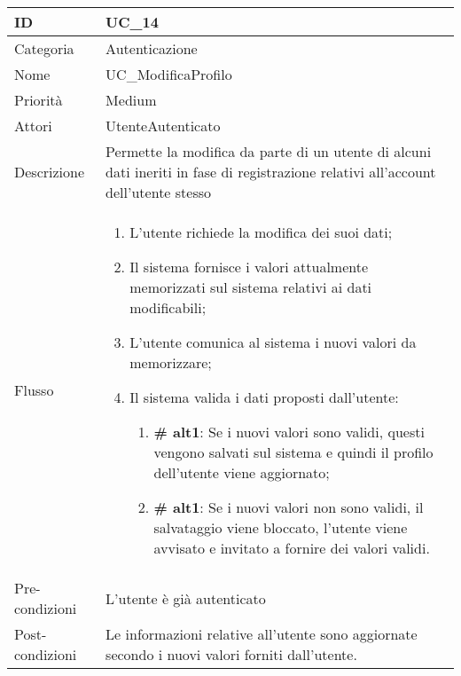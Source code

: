 \begin{center}
\begin{tabular}{ |p{2cm}|p{13cm}|  }
\hline
ID & UC\_14\\\hline
Categoria & Autenticazione \\\hline
Nome & UC\_ModificaProfilo \\\hline
Priorità & Medium \\\hline
Attori &  UtenteAutenticato \\\hline
Descrizione & Permette la modifica da parte di un utente di alcuni dati ineriti in fase di registrazione relativi all'account dell'utente stesso  \\\hline
Flusso &  	\begin{enumerate}
			\item L'utente richiede la modifica dei suoi dati;
			\item Il sistema fornisce i valori attualmente memorizzati sul sistema relativi ai dati modificabili;
			\item L'utente comunica al sistema i nuovi valori da memorizzare;
			\item Il sistema valida i dati proposti dall'utente:
			\begin{enumerate}[  ]
				\item\textbf{\# alt1}: Se i nuovi valori sono validi, questi vengono salvati sul sistema e quindi il profilo dell'utente viene aggiornato;
				\item\textbf{\# alt1}: Se i nuovi valori non sono validi, il salvataggio viene bloccato, l'utente viene avvisato e invitato a fornire dei valori validi.
			\end{enumerate}
		\end{enumerate}\\\hline
Pre-condizioni &  L'utente è già autenticato\\\hline
Post-condizioni &  Le informazioni relative all'utente sono aggiornate secondo i nuovi valori forniti dall'utente.\\\hline
\end{tabular}
\label{table_use_case:14}\newline


\end{center}
